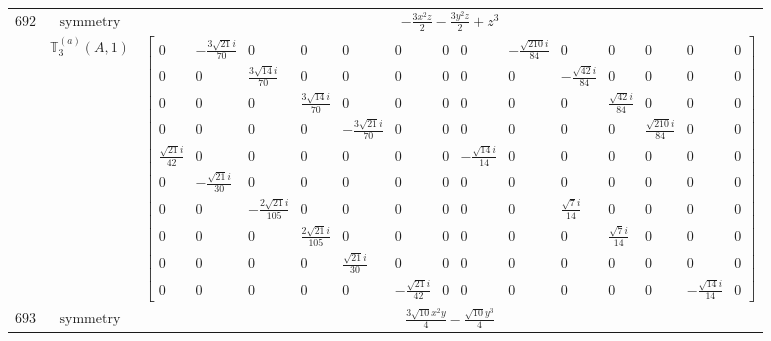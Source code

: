 \documentclass[fleqn,8pt,landscape]{jsarticle}
\begin{document}
\begin{longtable}{ccc}
$ 692 $ & $ \text{symmetry} $ & $ - \frac{3 x^{2} z}{2} - \frac{3 y^{2} z}{2} + z^{3} $ \\
$  $ & $ \mathbb{T}_{3}^{(a)}(A,1) $ & $ \begin{bmatrix} 0 & - \frac{3 \sqrt{21} i}{70} & 0 & 0 & 0 & 0 & 0 & 0 & - \frac{\sqrt{210} i}{84} & 0 & 0 & 0 & 0 & 0 \\ 0 & 0 & \frac{3 \sqrt{14} i}{70} & 0 & 0 & 0 & 0 & 0 & 0 & - \frac{\sqrt{42} i}{84} & 0 & 0 & 0 & 0 \\ 0 & 0 & 0 & \frac{3 \sqrt{14} i}{70} & 0 & 0 & 0 & 0 & 0 & 0 & \frac{\sqrt{42} i}{84} & 0 & 0 & 0 \\ 0 & 0 & 0 & 0 & - \frac{3 \sqrt{21} i}{70} & 0 & 0 & 0 & 0 & 0 & 0 & \frac{\sqrt{210} i}{84} & 0 & 0 \\ \frac{\sqrt{21} i}{42} & 0 & 0 & 0 & 0 & 0 & 0 & - \frac{\sqrt{14} i}{14} & 0 & 0 & 0 & 0 & 0 & 0 \\ 0 & - \frac{\sqrt{21} i}{30} & 0 & 0 & 0 & 0 & 0 & 0 & 0 & 0 & 0 & 0 & 0 & 0 \\ 0 & 0 & - \frac{2 \sqrt{21} i}{105} & 0 & 0 & 0 & 0 & 0 & 0 & \frac{\sqrt{7} i}{14} & 0 & 0 & 0 & 0 \\ 0 & 0 & 0 & \frac{2 \sqrt{21} i}{105} & 0 & 0 & 0 & 0 & 0 & 0 & \frac{\sqrt{7} i}{14} & 0 & 0 & 0 \\ 0 & 0 & 0 & 0 & \frac{\sqrt{21} i}{30} & 0 & 0 & 0 & 0 & 0 & 0 & 0 & 0 & 0 \\ 0 & 0 & 0 & 0 & 0 & - \frac{\sqrt{21} i}{42} & 0 & 0 & 0 & 0 & 0 & 0 & - \frac{\sqrt{14} i}{14} & 0 \end{bmatrix} $ \\ \hline
$ 693 $ & $ \text{symmetry} $ & $ \frac{3 \sqrt{10} x^{2} y}{4} - \frac{\sqrt{10} y^{3}}{4} $ \\

\end{longtable}
\end{document}
